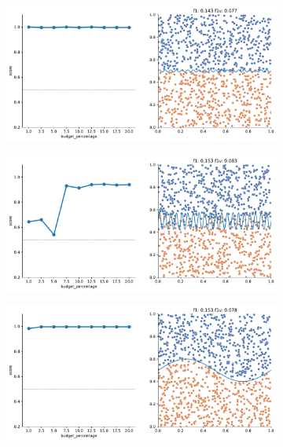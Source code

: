 \begin{appendices}
\begin{figure}
\begin{subfigure}{.5\textwidth}
    \end{subfigure}
    \begin{subfigure}{.5\textwidth}
        \centering
        \includegraphics[width=\textwidth]{img/2d_v2/6.pdf}
    \end{subfigure}%
    \hfill
    \begin{subfigure}{.5\textwidth}
        \centering
        \includegraphics[width=\textwidth]{img/2d_v2/9.pdf}
    \end{subfigure}
    \begin{subfigure}{.5\textwidth}
        \centering
        \includegraphics[width=\textwidth]{img/2d_v2/10.pdf}

\end{subfigure}
\end{figure}
\end{appendices}
